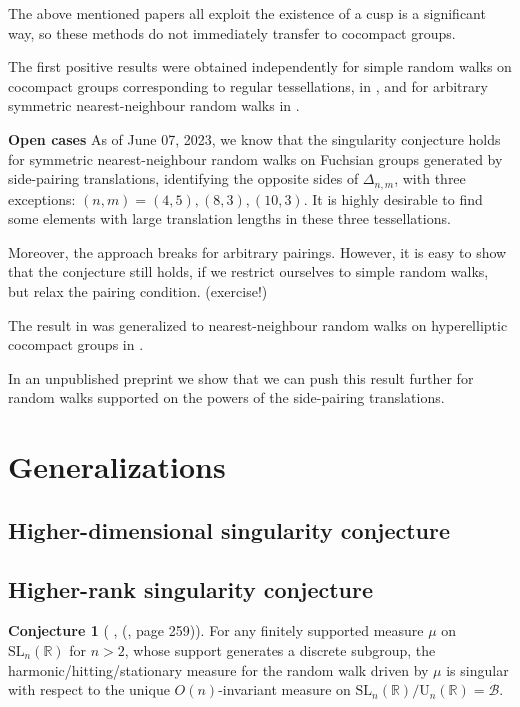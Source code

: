 \documentclass[11pt]{amsart}
\theoremstyle{definition}
\newtheorem{conjecture}{Conjecture}[section]
\begin{document}
	The above mentioned papers all exploit the existence of a cusp is a significant way, so these methods do not immediately transfer to cocompact groups. 
	
	The first positive results were obtained independently for simple random walks on cocompact groups corresponding to regular tessellations, in \cite{Carrasco2019OnTS}, and for arbitrary symmetric nearest-neighbour random walks in \cite{10.1093/imrn/rnaa213}.
	
	\textbf{Open cases} As of June 07, 2023, we know that the singularity conjecture holds for symmetric nearest-neighbour random walks on Fuchsian groups generated by side-pairing translations, identifying the opposite sides of $\Delta_{n, m}$, with three exceptions: $(n, m) = (4, 5), (8, 3), (10, 3)$. It is highly desirable to find some elements with large translation lengths in these three tessellations.
	
	Moreover, the approach breaks for arbitrary pairings. However, it is easy to show that the conjecture still holds, if we restrict ourselves to simple random walks, but relax the pairing condition. (exercise!)
	
	The result in \cite{10.1093/imrn/rnaa213} was generalized to nearest-neighbour random walks on hyperelliptic cocompact groups in \cite{kosenko_tiozzo_2022}.
	
	In an unpublished preprint \cite{kosenko2023asymptotics} we show that we can push this result further for random walks supported on the powers of the side-pairing translations.
	
	\section{Generalizations}
	\subsection{Higher-dimensional singularity conjecture}
	\subsection{Higher-rank singularity conjecture}
	\begin{conjecture}[ \cite{MR2568439}, (\cite{kaimanovich2011matrix}, page 259)]
		\label{Higher rank singularity conjecture}
		For any finitely supported measure $\mu$ on $\text{SL}_n(\mathbb{R})$ for $n > 2$, whose support generates a discrete subgroup, the harmonic/hitting/stationary measure for the random walk driven by $\mu$ is singular with respect to the unique $O(n)$-invariant measure on $\text{SL}_n(\mathbb{R}) / \text{U}_n(\mathbb{R}) = \mathcal{B}$.
	\end{conjecture}
	
	
	
	\printbibliography
	
\end{document}
